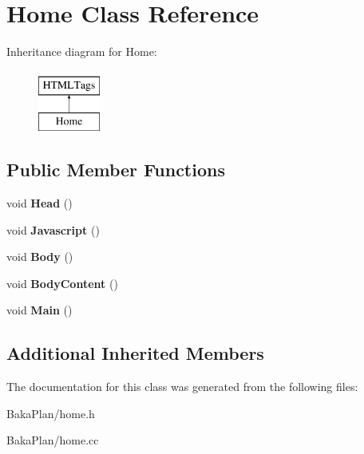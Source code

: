 \hypertarget{classHome}{\section{Home Class Reference}
\label{classHome}
}
Inheritance diagram for Home\-:\begin{figure}[H]
\begin{center}
\leavevmode
\includegraphics[height=2.000000cm]{classHome}
\end{center}
\end{figure}
\subsection*{Public Member Functions}
\begin{DoxyCompactItemize}
\item 
\hypertarget{classHome_aa327c2af7868c60c181806734e3b00f6}{void {\bfseries Head} ()}\label{classHome_aa327c2af7868c60c181806734e3b00f6}

\item 
\hypertarget{classHome_aa603fee7511d68025346d1e7fed09e80}{void {\bfseries Javascript} ()}\label{classHome_aa603fee7511d68025346d1e7fed09e80}

\item 
\hypertarget{classHome_a008d316a2ff266216dffc74042b6bd25}{void {\bfseries Body} ()}\label{classHome_a008d316a2ff266216dffc74042b6bd25}

\item 
\hypertarget{classHome_ab4cc0a979a58aea15ffdf20517b8f4e4}{void {\bfseries Body\-Content} ()}\label{classHome_ab4cc0a979a58aea15ffdf20517b8f4e4}

\item 
\hypertarget{classHome_aaecd93781c4fa1bd9d7a287c929be2fd}{void {\bfseries Main} ()}\label{classHome_aaecd93781c4fa1bd9d7a287c929be2fd}

\end{DoxyCompactItemize}
\subsection*{Additional Inherited Members}


The documentation for this class was generated from the following files\-:\begin{DoxyCompactItemize}
\item 
Baka\-Plan/home.\-h\item 
Baka\-Plan/home.\-cc\end{DoxyCompactItemize}
